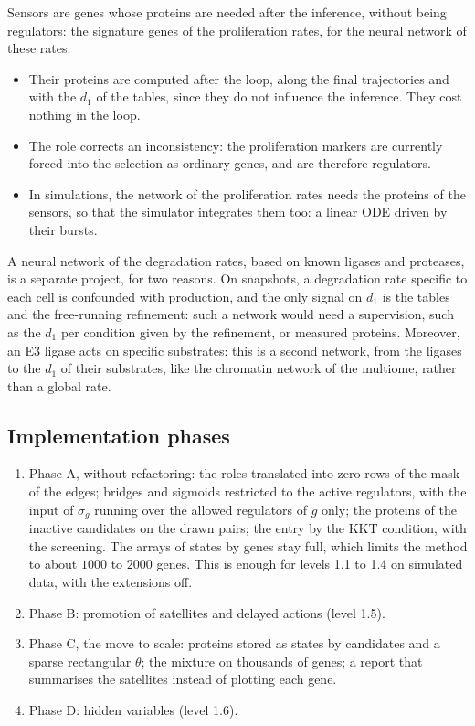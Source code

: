 \documentclass[a4paper, 11pt]{article}
\theoremstyle{plain}
\theoremstyle{remark}
\begin{document}
Sensors are genes whose proteins are needed after the inference, without being regulators: the signature genes of the proliferation rates, for the neural network of these rates.
\begin{itemize}[nosep]
\item Their proteins are computed after the loop, along the final trajectories and with the $d_1$ of the tables, since they do not influence the inference. They cost nothing in the loop.
\item The role corrects an inconsistency: the proliferation markers are currently forced into the selection as ordinary genes, and are therefore regulators.
\item In simulations, the network of the proliferation rates needs the proteins of the sensors, so that the simulator integrates them too: a linear ODE driven by their bursts.
\end{itemize}
A neural network of the degradation rates, based on known ligases and proteases, is a separate project, for two reasons. On snapshots, a degradation rate specific to each cell is confounded with production, and the only signal on $d_1$ is the tables and the free-running refinement: such a network would need a supervision, such as the $d_1$ per condition given by the refinement, or measured proteins. Moreover, an E3 ligase acts on specific substrates: this is a second network, from the ligases to the $d_1$ of their substrates, like the chromatin network of the multiome, rather than a global rate.

\subsection{Implementation phases}\label{sec:phases}

\begin{enumerate}[nosep]
\item Phase A, without refactoring: the roles translated into zero rows of the mask of the edges; bridges and sigmoids restricted to the active regulators, with the input of $\sigma_g$ running over the allowed regulators of $g$ only; the proteins of the inactive candidates on the drawn pairs; the entry by the KKT condition, with the screening. The arrays of states by genes stay full, which limits the method to about $1000$ to $2000$ genes. This is enough for levels 1.1 to 1.4 on simulated data, with the extensions off.
\item Phase B: promotion of satellites and delayed actions (level 1.5).
\item Phase C, the move to scale: proteins stored as states by candidates and a sparse rectangular $\theta$; the mixture on thousands of genes; a report that summarises the satellites instead of plotting each gene.
\item Phase D: hidden variables (level 1.6).
\end{enumerate}
\end{document}
